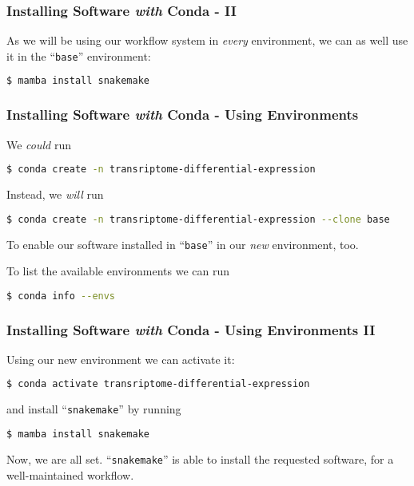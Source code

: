 \begin{frame}[fragile]
  \frametitle{Installing Software \emph{with} Conda - II}
  As we will be using our workflow system in \emph{every} environment, we can as well use it in the ``\texttt{base}'' environment:
  \begin{lstlisting}[language=Bash, style=Shell]
$ mamba install snakemake
  \end{lstlisting}
\end{frame}

\begin{frame}[fragile]
  \frametitle{Installing Software \emph{with} Conda - Using Environments}
  We \emph{could} run
  \begin{lstlisting}[language=Bash, style=Shell]
$ conda create -n transriptome-differential-expression
  \end{lstlisting}
  Instead, we \emph{will} run
  \begin{lstlisting}[language=Bash, style=Shell]
$ conda create -n transriptome-differential-expression --clone base
  \end{lstlisting}
  To enable our software installed in ``\texttt{base}'' in our \emph{new} environment, too.\newline

  To list the available environments we can run
  \begin{lstlisting}[language=Bash, style=Shell]
$ conda info --envs
  \end{lstlisting}
\end{frame}

\begin{frame}[fragile]
  \frametitle{Installing Software \emph{with} Conda - Using Environments II}
  Using our new environment we can activate it:
  \begin{lstlisting}[language=Bash, style=Shell]
$ conda activate transriptome-differential-expression
  \end{lstlisting}
  and install ``\texttt{snakemake}'' by running
  \begin{lstlisting}[language=Bash, style=Shell]
$ mamba install snakemake
  \end{lstlisting}
  Now, we are all set. ``\texttt{snakemake}'' is able to install the requested software, for a well-maintained workflow.
\end{frame}

